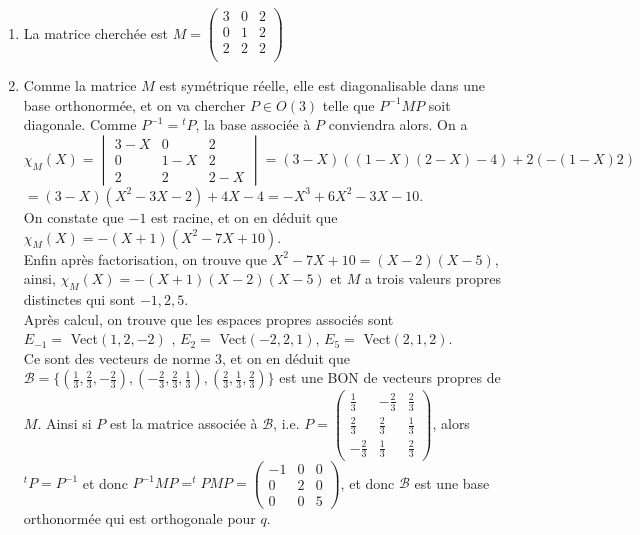 \documentclass[a4paper, 11pt]{article}
\theoremstyle{plain}
\begin{document}
\begin{enumerate}
\item 
La matrice cherchée est 
$M= 
\begin{pmatrix}
3&0&2\\
0&1&2\\
2&2&2\\
\end{pmatrix}$
\item 
Comme la matrice $M$ est symétrique réelle, elle est diagonalisable dans une base orthonormée, 
et on va chercher $P \in O(3)$ telle que 
$P^{-1}MP$ soit diagonale. Comme $P^{-1} = {^tP}$, la base associée à $P$ conviendra alors. 
On a \\ 
$\chi_M (X) = 
\begin{vmatrix}
3-X & 0&2\\
0&1-X & 2 \\
2&2&2-X
\end{vmatrix} 
= (3-X) ( (1-X)(2-X) -4) +2(-(1-X)2) $ \\
$=
(3-X)(X^2-3X -2) +4X -4 
=-X^3 +6X^2 -3X -10$. \\
On constate que $-1$ est racine, et on en déduit que 
$\chi_M(X) = -(X+1)(X^2-7X+10)$. \\
Enfin après factorisation, on trouve que  
$X^2-7X+10 = (X-2)(X-5)$, ainsi, 
$\chi_M(X) =-(X+1)(X-2)(X-5)$ et $M$ a trois valeurs propres distinctes qui sont 
$-1,2,5$.\\ 
Après calcul, on trouve que les espaces propres associés sont \\
$E_{-1} = $ Vect$(1,2,-2)$ , $E_2=$ Vect$(-2,2,1)$, $E_5=$ Vect$(2,1,2)$. \\
Ce sont des vecteurs de norme $3$, et on en déduit que 
$\mathcal{B}= 
\{ ( \frac{1}{3},\frac{2}{3},-\frac{2}{3} ) , (-\frac{2}{3}, \frac{2}{3}, \frac{1}{3}) , 
(\frac{2}{3}, \frac{1}{3}, \frac{2}{3} ) \}$ est une BON de vecteurs propres de $M$. 
Ainsi si $P$ est la matrice associée à $\mathcal{B}$, i.e. 
$P= 
\begin{pmatrix}
\frac{1}{3} &-\frac{2}{3} &\frac{2}{3} \\
\frac{2}{3} & \frac{2}{3} & \frac{1}{3} \\ 
-\frac{2}{3} & \frac{1}{3} & \frac{2}{3}
\end{pmatrix}$, 
alors $^tP=P^{-1}$ et donc 
$P^{-1}MP = ^tPMP = 
\begin{pmatrix}
-1&0&0\\
0&2&0 \\
0&0&5
\end{pmatrix}$, 
et donc $\mathcal{B}$ est une base orthonormée qui est orthogonale pour $q$.


\end{enumerate}
\end{document}
